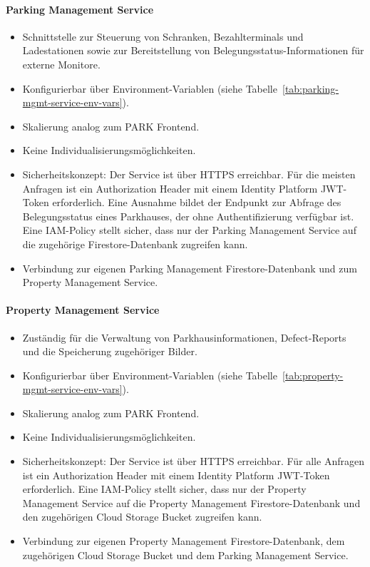 \paragraph{Parking Management Service}
\begin{itemize}
	\item Schnittstelle zur Steuerung von Schranken, Bezahlterminals und Ladestationen sowie zur Bereitstellung von Belegungsstatus-Informationen für externe Monitore.
	\item Konfigurierbar über Environment-Variablen (siehe Tabelle~\ref{tab:parking-mgmt-service-env-vars}).
	\item Skalierung analog zum PARK Frontend.
	\item Keine Individualisierungsmöglichkeiten.
	\item Sicherheitskonzept: Der Service ist über HTTPS erreichbar. Für die meisten Anfragen ist ein Authorization Header mit einem Identity Platform JWT-Token erforderlich. Eine Ausnahme bildet der Endpunkt zur Abfrage des Belegungsstatus eines Parkhauses, der ohne Authentifizierung verfügbar ist. Eine IAM-Policy stellt sicher, dass nur der Parking Management Service auf die zugehörige Firestore-Datenbank zugreifen kann.
	\item Verbindung zur eigenen Parking Management Firestore-Datenbank und zum Property Management Service.
\end{itemize}

\paragraph{Property Management Service}
\begin{itemize}
	\item Zuständig für die Verwaltung von Parkhausinformationen, Defect-Reports und die Speicherung zugehöriger Bilder.
	\item Konfigurierbar über Environment-Variablen (siehe Tabelle~\ref{tab:property-mgmt-service-env-vars}).
	\item Skalierung analog zum PARK Frontend.
	\item Keine Individualisierungsmöglichkeiten.
	\item Sicherheitskonzept: Der Service ist über HTTPS erreichbar. Für alle Anfragen ist ein Authorization Header mit einem Identity Platform JWT-Token erforderlich. Eine IAM-Policy stellt sicher, dass nur der Property Management Service auf die Property Management Firestore-Datenbank und den zugehörigen Cloud Storage Bucket zugreifen kann.
	\item Verbindung zur eigenen Property Management Firestore-Datenbank, dem zugehörigen Cloud Storage Bucket und dem Parking Management Service.
\end{itemize}

